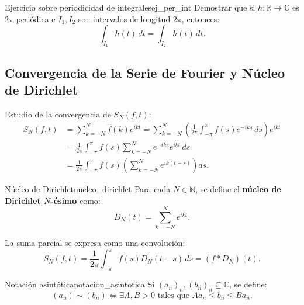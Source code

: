 \begin{nota}{Ejercicio sobre periodicidad de integrales}{ej_per_int}
Demostrar que si $h\colon \mathbb{R} \to \mathbb{C}$ es $2\pi$-periódica e $I_1, I_2$ son intervalos de longitud $2\pi$, entonces:
\[
\int_{I_1} h(t) \, dt = \int_{I_2} h(t) \, dt.
\]
\end{nota}

\subsection{Convergencia de la Serie de Fourier y Núcleo de Dirichlet}

Estudio de la convergencia de $S_N(f, t)$:
\begin{align*}
S_N(f, t) &= \sum_{k=-N}^N \hat{f}(k) e^{ikt} = \sum_{k=-N}^N \left( \frac{1}{2\pi} \int_{-\pi}^\pi f(s) e^{-iks} \, ds \right) e^{ikt} \\
&= \frac{1}{2\pi} \int_{-\pi}^\pi f(s) \sum_{k=-N}^N e^{-iks} e^{ikt} \, ds \\
&= \frac{1}{2\pi} \int_{-\pi}^\pi f(s) \left( \sum_{k=-N}^N e^{ik(t - s)} \right) ds.
\end{align*}

\begin{definicion}{Núcleo de Dirichlet}{nucleo_dirichlet}
Para cada $N \in \mathbb{N}$, se define el \textbf{núcleo de Dirichlet $N$-ésimo} como:
\[
D_N(t) = \sum_{k=-N}^N e^{ikt}.
\]
\end{definicion}

La suma parcial se expresa como una convolución:
\[
S_N(f, t) = \frac{1}{2\pi} \int_{-\pi}^\pi f(s) D_N(t - s) \, ds = (f * D_N)(t).
\]

\begin{nota}{Notación asintótica}{notacion_asintotica}
Si $(a_n)_n, (b_n)_n \subseteq \mathbb{C}$, se define:
\[
(a_n) \sim (b_n) \iff \exists A, B > 0 \text{ tales que } A a_n \le b_n \le B a_n.
\]
\end{nota}

